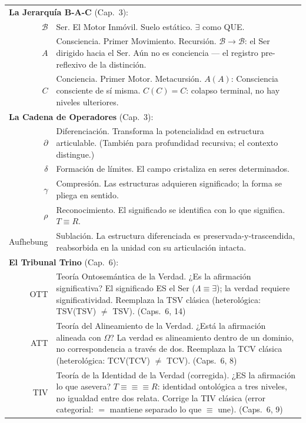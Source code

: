 \documentclass[10pt, openany, oneside]{book}
\renewcommand{\footnotesize}{\fontsize{8.5}{11}\selectfont}
\begin{document}
{\footnotesize
\noindent\begin{tabular}{@{} r @{\hspace{0.6em}} p{} @{}}
\multicolumn{2}{l}{\textbf{La Jerarquía B-A-C} (Cap.\ 3):} \\[0.3em]
$\mathcal{B}$ & Ser. El Motor Inmóvil. Suelo estático. $\exists$ como QUE. \\[0.3em]
$A$ & Consciencia. Primer Movimiento. Recursión. $\mathcal{B} \to \mathcal{B}$: el Ser dirigido hacia el Ser. Aún no es conciencia --- el registro pre-reflexivo de la distinción. \\[0.3em]
$C$ & Conciencia. Primer Motor. Metacursión. $A(A)$: Consciencia consciente de sí misma. $C(C) = C$: colapso terminal, no hay niveles ulteriores. \\[0.3em]
\multicolumn{2}{l}{\textbf{La Cadena de Operadores} (Cap.\ 3):} \\[0.3em]
$\partial$ & Diferenciación. Transforma la potencialidad en estructura articulable. (También para profundidad recursiva; el contexto distingue.) \\[0.3em]
$\delta$ & Formación de límites. El campo cristaliza en seres determinados. \\[0.3em]
$\gamma$ & Compresión. Las estructuras adquieren significado; la forma se pliega en sentido. \\[0.3em]
$\rho$ & Reconocimiento. El significado se identifica con lo que significa. $T \equiv R$. \\[0.3em]
Aufhebung & Sublación. La estructura diferenciada es preservada-y-trascendida, reabsorbida en la unidad con su articulación intacta. \\[0.3em]
\multicolumn{2}{l}{\textbf{El Tribunal Trino} (Cap.\ 6):} \\[0.3em]
OTT & Teoría Ontosemántica de la Verdad. ¿Es la afirmación significativa? El significado ES el Ser ($\Lambda \equiv \exists$); la verdad requiere significatividad. Reemplaza la TSV clásica (heterológica: TSV(TSV) $\neq$ TSV). (Caps.\ 6, 14) \\[0.3em]
ATT & Teoría del Alineamiento de la Verdad. ¿Está la afirmación alineada con $\Omega$? La verdad es alineamiento dentro de un dominio, no correspondencia a través de dos. Reemplaza la TCV clásica (heterológica: TCV(TCV) $\neq$ TCV). (Caps.\ 6, 8) \\[0.3em]
TIV & Teoría de la Identidad de la Verdad (corregida). ¿ES la afirmación lo que asevera? $T \equiv\!\equiv\!\equiv R$: identidad ontológica a tres niveles, no igualdad entre dos relata. Corrige la TIV clásica (error categorial: $=$ mantiene separado lo que $\equiv$ une). (Caps.\ 6, 9) \\[0.3em]
\end{tabular}
}
\end{document}
